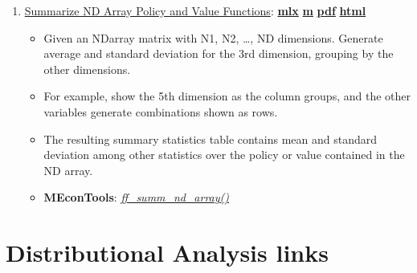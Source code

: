 \documentclass[
]{book}
\providecommand{\tightlist}{%
  \setlength{\itemsep}{0pt}\setlength{\parskip}{0pt}}
\begin{document}
\begin{enumerate}
\def\labelenumi{\arabic{enumi}.}
\tightlist
\item
  \href{https://fanwangecon.github.io/MEconTools/MEconTools/doc/summ/htmlpdfm/fx_summ_nd_array.html}{Summarize ND Array Policy and Value Functions}: \href{https://github.com/FanWangEcon/MEconTools/blob/master/MEconTools/doc/summ/fx_summ_nd_array.mlx}{\textbf{mlx}} \textbar{} \href{https://github.com/FanWangEcon/MEconTools/blob/master/MEconTools/doc/summ/htmlpdfm/fx_summ_nd_array.m}{\textbf{m}} \textbar{} \href{https://github.com/FanWangEcon/MEconTools/blob/master/MEconTools/doc/summ/htmlpdfm/fx_summ_nd_array.pdf}{\textbf{pdf}} \textbar{} \href{https://fanwangecon.github.io/MEconTools/MEconTools/doc/summ/htmlpdfm/fx_summ_nd_array.html}{\textbf{html}}

  \begin{itemize}
  \tightlist
  \item
    Given an NDarray matrix with N1, N2, \ldots, ND dimensions. Generate average and standard deviation for the 3rd dimension, grouping by the other dimensions.
  \item
    For example, show the 5th dimension as the column groups, and the other variables generate combinations shown as rows.
  \item
    The resulting summary statistics table contains mean and standard deviation among other statistics over the policy or value contained in the ND array.
  \item
    \textbf{MEconTools}: \emph{\href{https://github.com/FanWangEcon/MEconTools/blob/master/MEconTools/summ/ff_summ_nd_array.m}{ff\_summ\_nd\_array()}}
  \end{itemize}
\end{enumerate}

\hypertarget{distributional-analysis-links}{%
\section{Distributional Analysis links}\label{distributional-analysis-links}}
\end{document}

